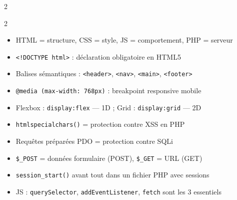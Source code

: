 \documentclass[a4paper,10pt]{article}
\begin{document}
\begin{multicols}{2}
\end{multicols}

\vspace{4pt}
\begin{tcolorbox}[basebox, colframe=orange, title=Points clés à retenir pour l'examen]
\begin{multicols}{2}
\begin{itemize}
  \item HTML = structure, CSS = style, JS = comportement, PHP = serveur
  \item \texttt{<!DOCTYPE html>} : déclaration obligatoire en HTML5
  \item Balises sémantiques : \texttt{<header>}, \texttt{<nav>}, \texttt{<main>}, \texttt{<footer>}
  \item \texttt{@media (max-width: 768px)} : breakpoint responsive mobile
  \item Flexbox : \texttt{display:flex} — 1D ; Grid : \texttt{display:grid} — 2D
  \item \texttt{htmlspecialchars()} = protection contre XSS en PHP
  \item Requêtes préparées PDO = protection contre SQLi
  \item \texttt{\$\_POST} = données formulaire (POST), \texttt{\$\_GET} = URL (GET)
  \item \texttt{session\_start()} avant tout dans un fichier PHP avec sessions
  \item JS : \texttt{querySelector}, \texttt{addEventListener}, \texttt{fetch} sont les 3 essentiels
\end{itemize}
\end{multicols}
\end{tcolorbox}
\end{document}
